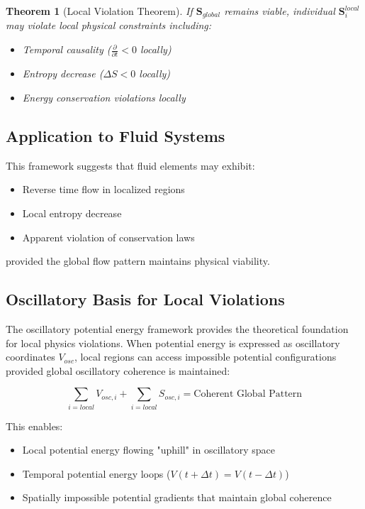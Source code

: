\documentclass[12pt,a4paper]{article}
\newtheorem{theorem}{Theorem}
\begin{document}
\begin{theorem}[Local Violation Theorem]
If $\mathbf{S}_{global}$ remains viable, individual $\mathbf{S}_i^{local}$ may violate local physical constraints including:
\begin{itemize}
\item Temporal causality ($\frac{\partial}{\partial t} < 0$ locally)
\item Entropy decrease ($\Delta S < 0$ locally)
\item Energy conservation violations locally
\end{itemize}
\end{theorem}

\subsection{Application to Fluid Systems}

This framework suggests that fluid elements may exhibit:
\begin{itemize}
\item Reverse time flow in localized regions
\item Local entropy decrease
\item Apparent violation of conservation laws
\end{itemize}

provided the global flow pattern maintains physical viability.

\subsection{Oscillatory Basis for Local Violations}

The oscillatory potential energy framework provides the theoretical foundation for local physics violations. When potential energy is expressed as oscillatory coordinates $V_{osc}$, local regions can access impossible potential configurations provided global oscillatory coherence is maintained:

\begin{equation}
\sum_{i=local} V_{osc,i} + \sum_{i=local} S_{osc,i} = \text{Coherent Global Pattern}
\end{equation}

This enables:
\begin{itemize}
\item Local potential energy flowing "uphill" in oscillatory space
\item Temporal potential energy loops ($V(t+\Delta t) = V(t-\Delta t)$)
\item Spatially impossible potential gradients that maintain global coherence
\end{itemize}
\end{document}
